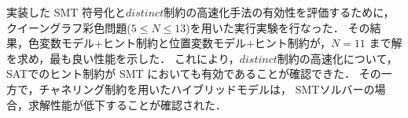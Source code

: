 実装した SMT 符号化と$distinct$制約の高速化手法の有効性を評価するために，
クイーングラフ彩色問題($5\leq N\leq 13$)を用いた実行実験を行なった．
その結果，色変数モデル+ヒント制約と位置変数モデル+ヒント制約が，$N=11$
まで解を求め，最も良い性能を示した．
これにより，$distinct$制約の高速化について，
SATでのヒント制約が SMT においても有効であることが確認できた．
その一方で，チャネリング制約を用いたハイブリッドモデルは，
SMTソルバーの場合，求解性能が低下することが確認された．


%
%
%
%
%
%
%
%
%
%
